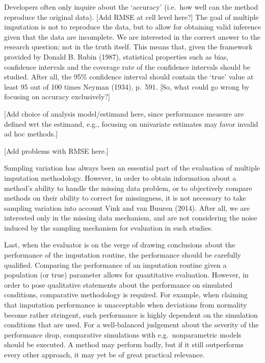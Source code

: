 \documentclass[
]{article}
\begin{document}
Developers often only inquire about the `accuracy' (i.e.~how well can
the method reproduce the original data). {[}Add RMSE at cell level
here?{]} The goal of multiple imputation is not to reproduce the data,
but to allow for obtaining valid inference given that the data are
incomplete. We are interested in the correct answer to the research
question; not in the truth itself. This means that, given the framework
provided by Donald B. Rubin (1987), statistical properties such as bias,
confidence intervals and the coverage rate of the confidence intervals
should be studied. After all, the 95\% confidence interval should
contain the `true' value at least 95 out of 100 times Neyman (1934),
p.~591. {[}So, what could go wrong by focusing on accuracy
exclusively?{]}

{[}Add choice of analysis model/estimand here, since performance measure
are defined wrt the estimand, e.g., focusing on univariate estimates may
favor invalid ad hoc methods.{]}

{[}Add problems with RMSE here.{]}

Sampling variation has always been an essential part of the evaluation
of multiple imputation methodology. However, in order to obtain
information about a method's ability to handle the missing data problem,
or to objectively compare methods on their ability to correct for
missingness, it is not necessary to take sampling variation into account
Vink and van Buuren (2014). After all, we are interested only in the
missing data mechanism, and are not considering the noise induced by the
sampling mechanism for evaluation in such studies.

Last, when the evaluator is on the verge of drawing conclusions about
the performance of the imputation routine, the performance should be
carefully qualified. Comparing the performance of an imputation routine
given a population (or true) parameter allows for quantitative
evaluation. However, in order to pose qualitative statements about the
performance on simulated conditions, comparative methodology is
required. For example, when claiming that imputation performance is
unacceptable when deviations from normality become rather stringent,
such performance is highly dependent on the simulation conditions that
are used. For a well-balanced judgement about the severity of the
performance drop, comparative simulations with e.g.~nonparametric models
should be executed. A method may perform badly, but if it still
outperforms every other approach, it may yet be of great practical
relevance.
\end{document}
